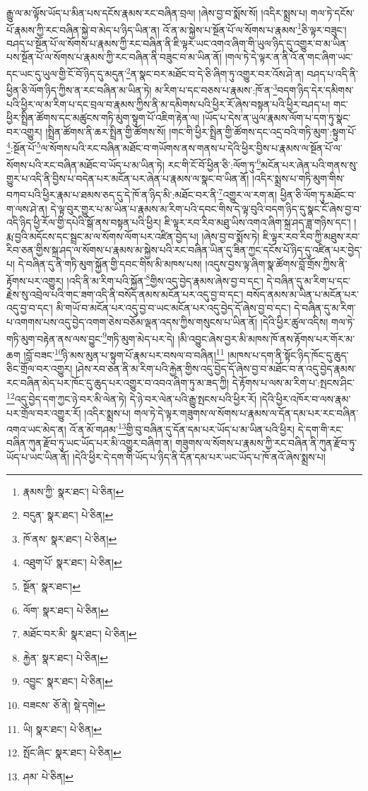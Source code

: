 རྒྱུ་ལ་མ་ལྟོས་ཡོད་པ་མིན་པས་དངོས་རྣམས་རང་བཞིན་བྲལ། །ཞེས་བྱ་བ་སྨོས་སོ། །འདིར་སྨྲས་པ། གལ་ཏེ་དངོས་པོ་རྣམས་ཀྱི་རང་བཞིན་སྐྱེ་བ་མེད་པ་ཉིད་ཡིན་ན། འོ་ན་མ་སྐྱེས་པ་སྔོན་པོ་ལ་སོགས་པ་རྣམས་\footnote{རྣམས་ཀྱི་  སྣར་ཐང་།  པེ་ཅིན། }ཅི་ལྟར་བཟུང་། བཤད་པ་སྔོན་པོ་ལ་སོགས་པ་རྣམས་ཀྱི་རང་བཞིན་ནི་ཇི་ལྟར་ཡང་འགའ་ཞིག་གི་ཡུལ་ཉིད་དུ་འགྱུར་བ་མ་ཡིན་པས་སྔོན་པོ་ལ་སོགས་པ་རྣམས་ཀྱི་རང་བཞིན་ནི་བཟུང་བ་མ་ཡིན་ནོ། །གལ་ཏེ་དེ་ལྟར་ན་ནི་འོ་ན་གང་ཞིག་ཡང་དང་ཡང་དུ་ཡུལ་གྱི་ངོ་བོ་ཉིད་དུ་མདུན་\footnote{བདུན་  སྣར་ཐང་།  པེ་ཅིན། }ན་སྣང་བར་མཐོང་བ་དེ་ཅི་ཞིག་ཏུ་འགྱུར་བར་འོས་ཤེ་ན། བཤད་པ་འདི་ནི་ཕྱིན་ཅི་ལོག་ཉིད་ཀྱིས་ན་རང་བཞིན་མ་ཡིན་ཏེ། མ་རིག་པ་དང་བཅས་པ་རྣམས་:ཁོ་ན་\footnote{ཁོ་ནས་  སྣར་ཐང་།  པེ་ཅིན། }བདག་ཉིད་དེར་དམིགས་པའི་ཕྱིར་ལ་མ་རིག་པ་དང་བྲལ་བ་རྣམས་ཀྱིས་ནི་མ་དམིགས་པའི་ཕྱིར་རོ་ཞེས་བསྟན་པའི་ཕྱིར་བཤད་པ། གང་ཕྱིར་སྤྲིན་ཚོགས་དང་མཚུངས་གཏི་མུག་སྟུག་པོ་འཇིག་རྟེན་ལ། །ཡོད་པ་དེས་ན་ཡུལ་རྣམས་ལོག་པ་དག་ཏུ་སྣང་བར་འགྱུར། །སྤྲིན་ཚོགས་ནི་ཆར་སྤྲིན་གྱི་ཚོགས་སོ། །གང་གི་ཕྱིར་སྤྲིན་གྱི་ཚོགས་དང་འདྲ་བའི་གཏི་མུག་:སྟུག་པོ་\footnote{འཐུག་པོ་  སྣར་ཐང་།  པེ་ཅིན། }:སྔོན་པོ་\footnote{སྔོན་  སྣར་ཐང་། }ལ་སོགས་པའི་རང་བཞིན་མཐོང་བ་གཡོགས་ནས་གནས་པ་དེའི་ཕྱིར་བྱིས་པ་རྣམས་ལ་སྔོན་པོ་ལ་སོགས་པའི་རང་བཞིན་མཐོང་བ་ཡོད་པ་མ་ཡིན་ཏེ། རང་གི་ངོ་བོ་ཕྱིན་ཅི་:ལོག་ཏུ་\footnote{ལོག་  སྣར་ཐང་།  པེ་ཅིན། }མངོན་པར་ཞེན་པའི་གནས་སུ་གྱུར་པ་འདི་ནི་བྱིས་པ་བདེན་པར་མངོན་པར་ཞེན་པ་རྣམས་ལ་སྣང་བ་ཡིན་ནོ། །འདིར་སྨྲས་པ་གཏི་མུག་གིས་བཀབ་པའི་ཕྱིར་རྣམ་པ་ཐམས་ཅད་དུ་དེ་ཁོ་ན་ཉིད་མི་:མཐོང་བར་ནི་\footnote{མཐོང་བར་མི་  སྣར་ཐང་།  པེ་ཅིན། }འགྱུར་ལ་རག་ན། ཕྱིན་ཅི་ལོག་ཏུ་མཐོང་བ་ག་ལས་ཤེ་ན། དེ་ལྟ་བུར་གྱུར་པ་མ་ཡིན་པ་རྣམས་མ་རིག་པའི་དབང་གིས་དེ་ལྟ་བུའི་བདག་ཉིད་དུ་སྣང་ངོ་ཞེས་བྱ་བ་འདི་ཉིད་ཕྱི་རོལ་གྱི་དཔེའི་སྒོ་ནས་བསྟན་པའི་ཕྱིར། ཇི་ལྟར་རབ་རིབ་མཐུ་ཡིས་འགའ་ཞིག་སྐྲ་ཤད་ཟླ་གཉིས་དང་། །རྨ་བྱའི་མདོངས་དང་སྦྲང་མ་ལ་སོགས་ལོག་པར་འཛིན་བྱེད་པ། །ཞེས་བྱ་བ་སྨོས་ཏེ། ཇི་ལྟར་རབ་རིབ་ཀྱི་མཐུས་རབ་རིབ་ཅན་གྱིས་སྐྲ་ཤད་ལ་སོགས་པ་རྣམས་མ་སྐྱེས་པའི་རང་བཞིན་ཡིན་དུ་ཟིན་ཀྱང་དངོས་པོ་ཉིད་དུ་འཛིན་པར་བྱེད་པ། དེ་བཞིན་དུ་ནི་གཏི་མུག་སྐྱོན་གྱི་དབང་གིས་མི་མཁས་པས། །འདུས་བྱས་ལྟ་ཞིག་སྣ་ཚོགས་བློ་གྲོས་ཀྱིས་ནི་རྟོགས་པར་འགྱུར། །འདི་ནི་མ་རིག་པའི་སྐྱོན་\footnote{རྐྱེན་  སྣར་ཐང་།  པེ་ཅིན། }གྱིས་འདུ་བྱེད་རྣམས་ཞེས་བྱ་བ་དང་། དེ་བཞིན་དུ་མ་རིག་པ་དང་རྗེས་སུ་འབྲེལ་པའི་གང་ཟག་འདི་ནི་བསོད་ནམས་མངོན་པར་འདུ་བྱ་བ་དང་། བསོད་ནམས་མ་ཡིན་པ་མངོན་པར་འདུ་བྱ་བ་དང་། མི་གཡོ་བ་མངོན་པར་འདུ་བྱ་བ་ཡང་མངོན་པར་འདུ་བྱེད་དོ་ཞེས་བྱ་བ་དང་། དེ་བཞིན་དུ་མ་རིག་པ་འགགས་པས་འདུ་བྱེད་འགག་ཅེས་བཅོམ་ལྡན་འདས་ཀྱིས་གསུངས་པ་ཡིན་ནོ། །དེའི་ཕྱིར་ཚུལ་འདིས། གལ་ཏེ་གཏི་མུག་བརྟེན་ནས་ལས་བྱུང་\footnote{འབྱུང་  སྣར་ཐང་།  པེ་ཅིན། }གཏི་མུག་མེད་པར་དེ། །མི་འབྱུང་ཞེས་བྱར་མི་མཁས་ཁོ་ནས་རྟོགས་པར་གོར་མ་ཆག །བློ་བཟང་\footnote{བཟངས་  ཅོ་ནེ།  སྡེ་དགེ། }ཉི་མས་མུན་པ་སྟུག་པོ་རྣམ་པར་བསལ་བ་བཞིན།\footnote{ཡི།  སྣར་ཐང་།  པེ་ཅིན། } །མཁས་པ་དག་ནི་སྟོང་ཉིད་ཁོང་དུ་ཆུད་ཅིང་གྲོལ་བར་འགྱུར། །ཤེས་རབ་ཅན་ནི་མ་རིག་པའི་རྐྱེན་གྱིས་འདུ་བྱེད་དོ་ཞེས་བྱ་བ་མཐོང་བ་ན་འདུ་བྱེད་རྣམས་རང་བཞིན་མེད་པར་ཁོང་དུ་ཆུད་པར་འགྱུར་བ་འབའ་ཞིག་ཏུ་མ་ཟད་ཀྱི། དེ་རྟོགས་པ་ལས་མ་རིག་པ་:སྤངས་ཤིང་\footnote{སྤོང་ཞིང་  སྣར་ཐང་།  པེ་ཅིན། }འདུ་བྱེད་དག་ཀྱང་ཉེ་བར་མི་ལེན་ཏེ། དེ་ཉེ་བར་ལེན་པའི་རྒྱུ་སྤངས་པའི་ཕྱིར་རོ། །དེའི་ཕྱིར་འཁོར་བ་ལས་རྣམ་པར་གྲོལ་བར་འགྱུར་རོ། །འདིར་སྨྲས་པ། གལ་ཏེ་དེ་ལྟར་གཟུགས་ལ་སོགས་པ་རྣམས་ལ་དོན་དམ་པར་རང་བཞིན་འགའ་ཡང་མེད་ན། འོ་ན་མོ་གཤམ་\footnote{ཤམ་  པེ་ཅིན། }གྱི་བུ་བཞིན་དུ་དོན་དམ་པར་ཡོད་པ་མ་ཡིན་པའི་ཕྱིར། དེ་དག་གི་རང་བཞིན་ཀུན་རྫོབ་ཏུ་ཡང་ཡོད་པར་མི་འགྱུར་བཞིག་ན། གཟུགས་ལ་སོགས་པ་རྣམས་ཀྱི་རང་བཞིན་ནི་ཀུན་རྫོབ་ཏུ་ཡོད་པ་ཡང་ཡིན་ནོ། །དེའི་ཕྱིར་དེ་དག་གི་ཡོད་པ་ཉིད་ནི་དོན་དམ་པར་ཡང་ཡོད་པ་ཁོ་ནའོ་ཞེས་སྨྲས་པ། 
